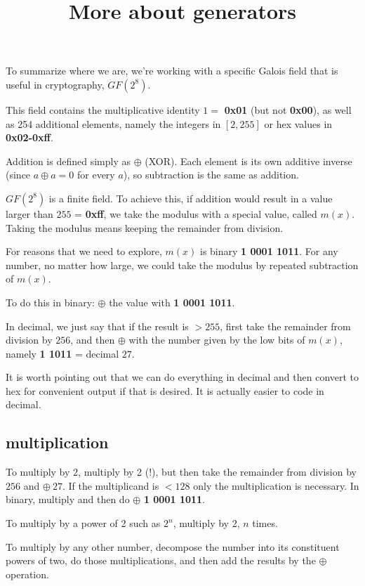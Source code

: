 \documentclass[11pt, oneside]{article}
\title{More about generators}
\date{}
\begin{document}
\maketitle

\Large
To summarize where we are, we're working with a specific Galois field that is useful in cryptography, $GF(2^8)$.  

This field contains the multiplicative identity $1 =$ \textbf{0x01} (but not \textbf{0x00}), as well as 254 additional elements, namely the integers in $[2,255]$ or hex values in \textbf{0x02-0xff}.

Addition is defined simply as $\oplus$ (XOR).  Each element is its own additive inverse (since $a \oplus a = 0$ for every $a$), so subtraction is the same as addition.

$GF(2^8)$ is a finite field.  To achieve this, if addition would result in a value larger than $255$ = \textbf{0xff}, we take the modulus with a special value, called $m(x)$.  Taking the modulus means keeping the remainder from division.

For reasons that we need to explore, $m(x)$ is binary \textbf{1 0001 1011}.  For any number, no matter how large, we could take the modulus by repeated subtraction of $m(x)$.

To do this in binary:  $\oplus$ the value with \textbf{1 0001 1011}.

In decimal, we just say that if the result is $> 255$, first take the remainder from division by $256$, and then $\oplus$ with the number given by the low bits of $m(x)$, namely \textbf{1 1011} = decimal $27$.

It is worth pointing out that we can do everything in decimal and then convert to hex for convenient output if that is desired.  It is actually easier to code in decimal.

\subsection*{multiplication}

To multiply by $2$, multiply by 2 (!), but then take the remainder from division by $256$ and $\oplus \ 27$.  If the multiplicand is $< 128$ only the multiplication is necessary.  In binary, multiply and then do $\oplus$ \textbf{1 0001 1011}.  

To multiply by a power of 2 such as $2^n$, multiply by 2, $n$ times.

To multiply by any other number, decompose the number into its constituent powers of two, do those multiplications, and then add the results by the $\oplus$ operation.
\end{document}
